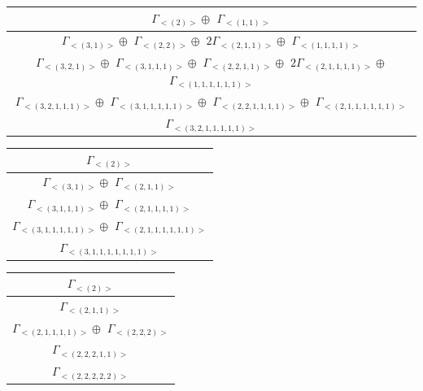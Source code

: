 \bigskip
\begin{minipage}{1\textwidth}
\centering
\begin{tabular}{|c|}\hline
$\Gamma_{<(
2
)>} \oplus$
$\Gamma_{<(
1 , 
1
)>}$
\\ \hline
$\Gamma_{<(
3 , 
1
)>} \oplus$
$\Gamma_{<(
2 , 
2
)>} \oplus$
$ 2 \Gamma_{<(
2 , 
1 , 
1
)>} \oplus$
$\Gamma_{<(
1 , 
1 , 
1 , 
1
)>}$
\\ \hline
$\Gamma_{<(
3 , 
2 , 
1
)>} \oplus$
$\Gamma_{<(
3 , 
1 , 
1 , 
1
)>} \oplus$
$\Gamma_{<(
2 , 
2 , 
1 , 
1
)>} \oplus$
$ 2 \Gamma_{<(
2 , 
1 , 
1 , 
1 , 
1
)>} \oplus$
$\Gamma_{<(
1 , 
1 , 
1 , 
1 , 
1 , 
1
)>}$
\\ \hline
$\Gamma_{<(
3 , 
2 , 
1 , 
1 , 
1
)>} \oplus$
$\Gamma_{<(
3 , 
1 , 
1 , 
1 , 
1 , 
1
)>} \oplus$
$\Gamma_{<(
2 , 
2 , 
1 , 
1 , 
1 , 
1
)>} \oplus$
$\Gamma_{<(
2 , 
1 , 
1 , 
1 , 
1 , 
1 , 
1
)>}$
\\ \hline
$\Gamma_{<(
3 , 
2 , 
1 , 
1 , 
1 , 
1 , 
1
)>}$
\\
\hline\end{tabular}\end{minipage}
\bigskip
\begin{minipage}{.5\textwidth}
\centering
\begin{tabular}{|c|}\hline
$\Gamma_{<(
2
)>}$
\\ \hline
$\Gamma_{<(
3 , 
1
)>} \oplus$
$\Gamma_{<(
2 , 
1 , 
1
)>}$
\\ \hline
$\Gamma_{<(
3 , 
1 , 
1 , 
1
)>} \oplus$
$\Gamma_{<(
2 , 
1 , 
1 , 
1 , 
1
)>}$
\\ \hline
$\Gamma_{<(
3 , 
1 , 
1 , 
1 , 
1 , 
1
)>} \oplus$
$\Gamma_{<(
2 , 
1 , 
1 , 
1 , 
1 , 
1 , 
1
)>}$
\\ \hline
$\Gamma_{<(
3 , 
1 , 
1 , 
1 , 
1 , 
1 , 
1 , 
1
)>}$
\\
\hline\end{tabular}\end{minipage}
\begin{minipage}{.5\textwidth}
\centering
\begin{tabular}{|c|}\hline
$\Gamma_{<(
2
)>}$
\\ \hline
$\Gamma_{<(
2 , 
1 , 
1
)>}$
\\ \hline
$\Gamma_{<(
2 , 
1 , 
1 , 
1 , 
1
)>} \oplus$
$\Gamma_{<(
2 , 
2 , 
2
)>}$
\\ \hline
$\Gamma_{<(
2 , 
2 , 
2 , 
1 , 
1
)>}$
\\ \hline
$\Gamma_{<(
2 , 
2 , 
2 , 
2 , 
2
)>}$
\\
\hline\end{tabular}\end{minipage}
